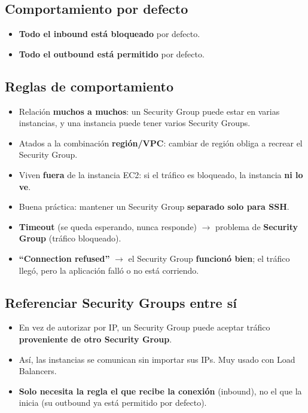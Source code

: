 \documentclass[11pt,a4paper]{article}
\let\oldsubsection\subsection
\renewcommand{\subsection}{\Needspace{6\baselineskip}\oldsubsection}
\begin{document}
\subsection{Comportamiento por defecto}
\begin{itemize}
  \item \textbf{Todo el inbound está bloqueado} por defecto.
  \item \textbf{Todo el outbound está permitido} por defecto.
\end{itemize}

\subsection{Reglas de comportamiento}
\begin{itemize}
  \item Relación \textbf{muchos a muchos}: un Security Group puede estar en varias instancias, y una instancia puede tener varios Security Groups.
  \item Atados a la combinación \textbf{región/VPC}: cambiar de región obliga a recrear el Security Group.
  \item Viven \textbf{fuera} de la instancia EC2: si el tráfico es bloqueado, la instancia \textbf{ni lo ve}.
  \item Buena práctica: mantener un Security Group \textbf{separado solo para SSH}.
\end{itemize}

\begin{alerta}[title=Diagnóstico de errores (examinable)]
\begin{itemize}
  \item \textbf{Timeout} (se queda esperando, nunca responde) $\rightarrow$ problema de \textbf{Security Group} (tráfico bloqueado).
  \item \textbf{``Connection refused''} $\rightarrow$ el Security Group \textbf{funcionó bien}; el tráfico llegó, pero la aplicación falló o no está corriendo.
\end{itemize}
\end{alerta}

\subsection{Referenciar Security Groups entre sí}
\begin{itemize}
  \item En vez de autorizar por IP, un Security Group puede aceptar tráfico \textbf{proveniente de otro Security Group}.
  \item Así, las instancias se comunican sin importar sus IPs. Muy usado con Load Balancers.
  \item \textbf{Solo necesita la regla el que recibe la conexión} (inbound), no el que la inicia (su outbound ya está permitido por defecto).
\end{itemize}
\end{document}

